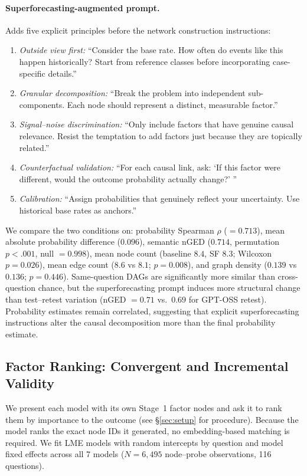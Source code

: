 \documentclass[11pt]{article}
\begin{document}
\paragraph{Superforecasting-augmented prompt.} Adds five explicit principles before the network construction instructions:
\begin{enumerate}
\small
\item \textit{Outside view first:} ``Consider the base rate. How often do events like this happen historically? Start from reference classes before incorporating case-specific details.''
\item \textit{Granular decomposition:} ``Break the problem into independent sub-components. Each node should represent a distinct, measurable factor.''
\item \textit{Signal--noise discrimination:} ``Only include factors that have genuine causal relevance. Resist the temptation to add factors just because they are topically related.''
\item \textit{Counterfactual validation:} ``For each causal link, ask: `If this factor were different, would the outcome probability actually change?' ''
\item \textit{Calibration:} ``Assign probabilities that genuinely reflect your uncertainty. Use historical base rates as anchors.''
\end{enumerate}

We compare the two conditions on: probability Spearman $\rho$ ($= 0.713$), mean absolute probability difference ($0.096$), semantic nGED ($0.714$, permutation $p < .001$, null $= 0.998$), mean node count (baseline $8.4$, SF $8.3$; Wilcoxon $p = 0.026$), mean edge count ($8.6$ vs $8.1$; $p = 0.008$), and graph density ($0.139$ vs $0.136$; $p = 0.446$). Same-question DAGs are significantly more similar than cross-question chance, but the superforecasting prompt induces more structural change than test--retest variation (nGED $= 0.71$ vs.\ $0.69$ for GPT-OSS retest). Probability estimates remain correlated, suggesting that explicit superforecasting instructions alter the causal decomposition more than the final probability estimate.

\subsection{Factor Ranking: Convergent and Incremental Validity}
\label{app:factor-ranking}

We present each model with its own Stage~1 factor nodes and ask it to rank them by importance to the outcome (see \S\ref{sec:setup} for procedure). Because the model ranks the exact node IDs it generated, no embedding-based matching is required. We fit LME models with random intercepts by question and model fixed effects across all 7 models ($N = 6{,}495$ node--probe observations, 116 questions).
\end{document}

